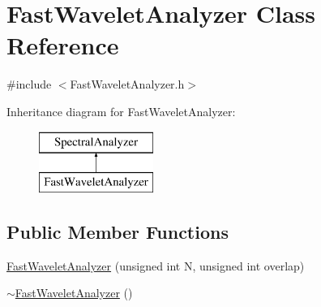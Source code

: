\hypertarget{class_fast_wavelet_analyzer}{\section{Fast\+Wavelet\+Analyzer Class Reference}
\label{class_fast_wavelet_analyzer}
}


{\ttfamily \#include $<$Fast\+Wavelet\+Analyzer.\+h$>$}

Inheritance diagram for Fast\+Wavelet\+Analyzer\+:\begin{figure}[H]
\begin{center}
\leavevmode
\includegraphics[height=2.000000cm]{class_fast_wavelet_analyzer}
\end{center}
\end{figure}
\subsection*{Public Member Functions}
\begin{DoxyCompactItemize}
\item 
\hyperlink{class_fast_wavelet_analyzer_ab7883d282ec0866f3c1660f475eea767}{Fast\+Wavelet\+Analyzer} (unsigned int N, unsigned int overlap)
\item 
\hyperlink{class_fast_wavelet_analyzer_ac24b3e5df3fcb69212211bc0d70a067d}{$\sim$\+Fast\+Wavelet\+Analyzer} ()
\end{DoxyCompactItemize}


